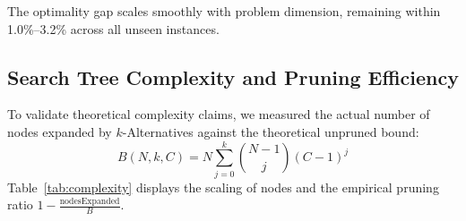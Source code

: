 \documentclass[11pt,a4paper]{article}
\begin{document}
\begin{table}[htbp]
\centering
\small
\caption{\textbf{Hold-Out Generalization on Unseen Instances (Frozen Defaults: $k=3$, $C=20$).}}
\label{tab:holdout}
\end{table}

The optimality gap scales smoothly with problem dimension, remaining within 1.0\%--3.2\% across all unseen instances.

\subsection{Search Tree Complexity and Pruning Efficiency}
To validate theoretical complexity claims, we measured the actual number of nodes expanded by $k$-Alternatives against the theoretical unpruned bound:
\begin{equation}
    B(N, k, C) = N \sum_{j=0}^k \binom{N-1}{j} (C-1)^j
\end{equation}
Table~\ref{tab:complexity} displays the scaling of nodes and the empirical pruning ratio $1 - \frac{\text{nodesExpanded}}{B}$.

\begin{table}[htbp]
\centering
\small
\caption{\textbf{Empirical Node Complexity vs. Theoretical Upper Bound (`bays29`, $N=29$).}}
\label{tab:complexity}
\end{table}
\end{document}
